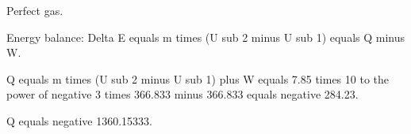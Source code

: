 Perfect gas.  

Energy balance:  
Delta E equals m times (U sub 2 minus U sub 1) equals Q minus W.  

Q equals m times (U sub 2 minus U sub 1) plus W equals 7.85 times 10 to the power of negative 3 times 366.833 minus 366.833 equals negative 284.23.  

Q equals negative 1360.15333.